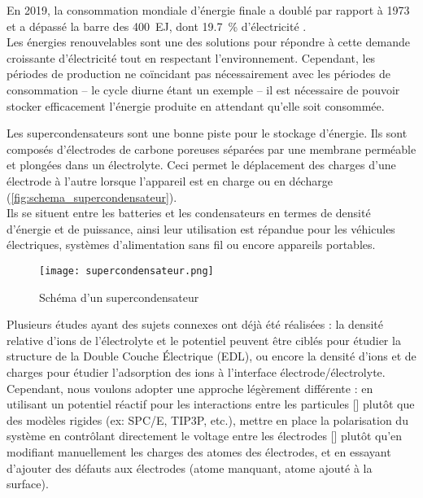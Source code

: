 En 2019, la consommation mondiale d'énergie finale a doublé par rapport à 1973 et a dépassé la barre des \qty{400}{\exa \joule}, dont \qty{19.7}{\percent} d'électricité \cite{birol_key_nodate}.\\
Les énergies renouvelables sont une des solutions pour répondre à cette demande croissante d'électricité tout en respectant l'environnement. Cependant, les périodes de production ne coïncidant pas nécessairement avec les périodes de consommation -- le cycle diurne étant un exemple -- il est nécessaire de pouvoir stocker efficacement l'énergie produite en attendant qu'elle soit consommée.

Les supercondensateurs sont une bonne piste pour le stockage d'énergie. Ils sont composés d'électrodes de carbone poreuses séparées par une membrane perméable et plongées dans un électrolyte. Ceci permet le déplacement des charges d'une électrode à l'autre lorsque l'appareil est en charge ou en décharge (\autoref{fig:schema_supercondensateur}).\\
Ils se situent entre les batteries et les condensateurs en termes de densité d'énergie et de puissance, ainsi leur utilisation est répandue pour les véhicules électriques, systèmes d'alimentation sans fil ou encore appareils portables.

\begin{figure}[hb]
    \centering
    \texttt{[image: supercondensateur.png]}
    \caption{Schéma d'un supercondensateur}
    \label{fig:schema_supercondensateur}
\end{figure}

Plusieurs études ayant des sujets connexes ont déjà été réalisées : la densité relative d'ions de l'électrolyte et le potentiel peuvent être ciblés pour étudier la structure de la Double Couche Électrique (EDL)\cite{jiang_molecular_2016}, ou encore la densité d'ions et de charges pour étudier l'adsorption des ions à l'interface électrode/électrolyte\cite{cole_ion_2011}. Cependant, nous voulons adopter une approche légèrement différente : en utilisant un potentiel réactif pour les interactions entre les particules [\reaxff{}] plutôt que des modèles rigides (ex: SPC/E, TIP3P, etc.), mettre en place la polarisation du système en contrôlant directement le voltage entre les électrodes [\echemdid{}] plutôt qu'en modifiant manuellement les charges des atomes des électrodes, et en essayant d'ajouter des défauts aux électrodes (atome manquant, atome ajouté à la surface).

